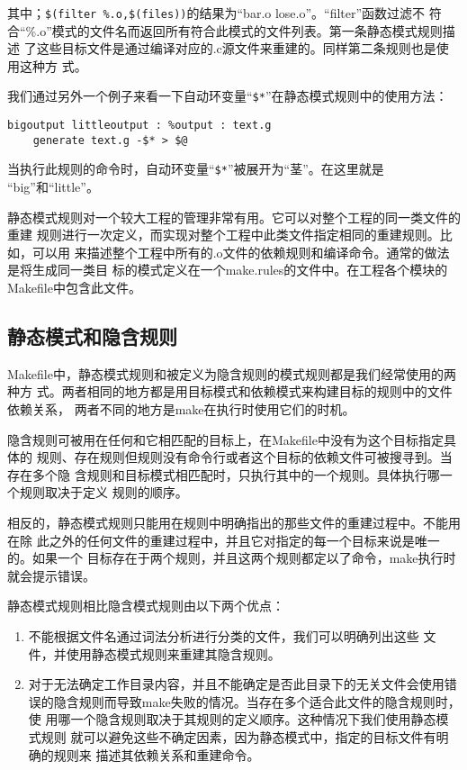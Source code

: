 其中；\verb"$(filter %.o,$(files))"的结果为“bar.o lose.o”。“filter”函数过滤不
符合“\%.o”模式的文件名而返回所有符合此模式的文件列表。第一条静态模式规则描述
了这些目标文件是通过编译对应的.c源文件来重建的。同样第二条规则也是使用这种方
式。

我们通过另外一个例子来看一下自动环变量“\verb"$*"”在静态模式规则中的使用方法：
\begin{Verbatim}[]
bigoutput littleoutput : %output : text.g
    generate text.g -$* > $@
\end{Verbatim}

当执行此规则的命令时，自动环变量“\verb"$*"”被展开为“茎”。在这里就是
“big”和“little”。

静态模式规则对一个较大工程的管理非常有用。它可以对整个工程的同一类文件的重建
规则进行一次定义，而实现对整个工程中此类文件指定相同的重建规则。比如，可以用
来描述整个工程中所有的.o文件的依赖规则和编译命令。通常的做法是将生成同一类目
标的模式定义在一个make.rules的文件中。在工程各个模块的Makefile中包含此文件。

\subsection{静态模式和隐含规则}
Makefile中，静态模式规则和被定义为隐含规则的模式规则都是我们经常使用的两种方
式。两者相同的地方都是用目标模式和依赖模式来构建目标的规则中的文件依赖关系，
两者不同的地方是make在执行时使用它们的时机。

隐含规则可被用在任何和它相匹配的目标上，在Makefile中没有为这个目标指定具体的
规则、存在规则但规则没有命令行或者这个目标的依赖文件可被搜寻到。当存在多个隐
含规则和目标模式相匹配时，只执行其中的一个规则。具体执行哪一个规则取决于定义
规则的顺序。

相反的，静态模式规则只能用在规则中明确指出的那些文件的重建过程中。不能用在除
此之外的任何文件的重建过程中，并且它对指定的每一个目标来说是唯一的。如果一个
目标存在于两个规则，并且这两个规则都定以了命令，make执行时就会提示错误。

静态模式规则相比隐含模式规则由以下两个优点：

\begin{enumerate}
\itemsep=0pt \parskip=0pt
\item       不能根据文件名通过词法分析进行分类的文件，我们可以明确列出这些
    文件，并使用静态模式规则来重建其隐含规则。
\item 对于无法确定工作目录内容，并且不能确定是否此目录下的无关文件会使用错
    误的隐含规则而导致make失败的情况。当存在多个适合此文件的隐含规则时，使
    用哪一个隐含规则取决于其规则的定义顺序。这种情况下我们使用静态模式规则
    就可以避免这些不确定因素，因为静态模式中，指定的目标文件有明确的规则来
    描述其依赖关系和重建命令。
\end{enumerate}

